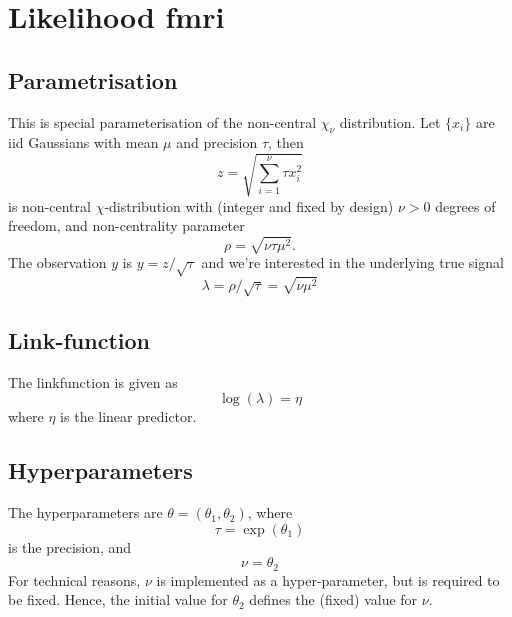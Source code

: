 \documentclass[a4paper,11pt]{article}
\begin{document}
\section*{Likelihood \textbf{fmri}}

\subsection*{Parametrisation}

This is special parameterisation of the non-central $\chi_\nu$
distribution. Let $\{x_i\}$ are iid Gaussians with mean $\mu$ and
precision $\tau$, then
\begin{displaymath}
    z = \sqrt{\sum_{i=1}^{\nu} \tau x_i^{2}}
\end{displaymath}
is non-central $\chi$-distribution with (integer and fixed by design) $\nu>0$ degrees of
freedom, and non-centrality parameter
\begin{displaymath}
    \rho = \sqrt{\nu \tau \mu^{2}}.
\end{displaymath}
The observation $y$ is $y=z/\sqrt{\tau}$
and we're interested in the underlying true signal
\begin{displaymath}
    \lambda=\rho/\sqrt{\tau} = \sqrt{\nu\mu^{2}}
\end{displaymath}

\subsection*{Link-function}

The linkfunction is given as 
\begin{displaymath}
    \log(\lambda) =  \eta
\end{displaymath}
where $\eta$  is the linear predictor.

\subsection*{Hyperparameters}

The hyperparameters are ${\theta}=(\theta_1,\theta_2)$, where
\begin{displaymath}
    \tau = \exp(\theta_1)
\end{displaymath}
is the precision, and
\begin{displaymath}
    \nu = \theta_2
\end{displaymath}
For technical reasons, $\nu$ is implemented as a hyper-parameter, but
is required to be fixed. Hence, the initial value for $\theta_2$
defines the (fixed) value for $\nu$.
\end{document}
